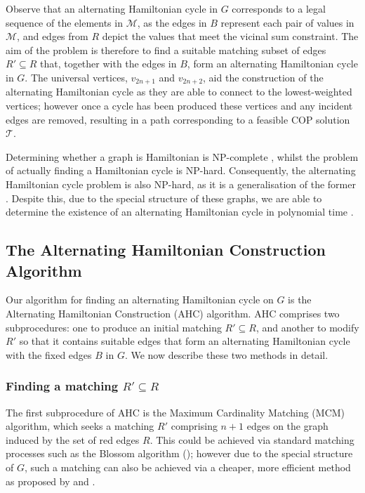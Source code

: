 \documentclass[authoryear]{elsarticle}
\begin{document}
\noindent Observe that an alternating Hamiltonian cycle in $G$ corresponds to a legal sequence of the elements in $\mathcal{M}$, as the edges in $B$ represent each pair of values in $\mathcal{M}$, and edges from $R$ depict the values that meet the vicinal sum constraint. The aim of the problem is therefore to find a suitable matching subset of edges $R' \subseteq R$ that, together with the edges in $B$, form an alternating Hamiltonian cycle in $G$. The universal vertices, $v_{2n+1}$ and $v_{2n+2}$, aid the construction of the alternating Hamiltonian cycle as they are able to connect to the lowest-weighted vertices; however once a cycle has been produced these vertices and any incident edges are removed, resulting in a path corresponding to a feasible COP solution $\mathcal{T}$.

Determining whether a graph is Hamiltonian is NP-complete \citep{karp1972}, whilst the problem of actually finding a Hamiltonian cycle is NP-hard. Consequently, the alternating Hamiltonian cycle problem is also NP-hard, as it is a generalisation of the former \citep{haggkvist1977}. Despite this, due to the special structure of these graphs, we are able to determine the existence of an alternating Hamiltonian cycle in polynomial time \citep{hawa2018}. 

\subsection{The Alternating Hamiltonian Construction Algorithm}
\label{sub:ahc}
\noindent Our algorithm for finding an alternating Hamiltonian cycle on $G$ is the Alternating Hamiltonian Construction (AHC) algorithm. AHC comprises two subprocedures: one to produce an initial matching $R' \subseteq R$, and another to modify $R'$ so that it contains suitable edges that form an alternating Hamiltonian cycle with the fixed edges $B$ in $G$. We now describe these two methods in detail.

\subsubsection{Finding a matching $R' \subseteq R$}
\label{subsub:mcm}
\noindent The first subprocedure of AHC is the Maximum Cardinality Matching (MCM) algorithm, which seeks a matching $R'$ comprising $n+1$ edges on the graph induced by the set of red edges $R$. This could be achieved via standard matching processes such as the Blossom algorithm (\cite{edmonds1965}); however due to the special structure of $G$, such a matching can also be achieved via a cheaper, more efficient method as proposed by \cite{mahadev1994} and \cite{becker2015}. 
\end{document}
